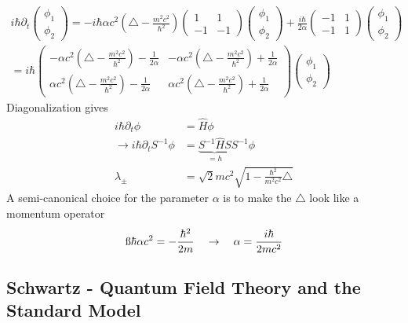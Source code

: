 \documentclass[10pt,a4paper]{book}
\theoremstyle{definition}
\begin{document}
\begin{align}
i\hbar\partial_t\begin{pmatrix}
\phi_1 \\
\phi_2 
\end{pmatrix}=-i\hbar\alpha c^2\left(\triangle-\frac{m^2c^2}{\hbar^2}\right)
\begin{pmatrix}
 1 &  1 \\
-1 & -1 
\end{pmatrix}\begin{pmatrix}
\phi_1 \\
\phi_2 
\end{pmatrix}
+\frac{i\hbar}{2\alpha}
\begin{pmatrix}
-1 &  1 \\
-1 &  1 
\end{pmatrix}
\begin{pmatrix}
\phi_1 \\
\phi_2 
\end{pmatrix}\\
=i\hbar\begin{pmatrix}
-\alpha c^2\left(\triangle-\frac{m^2c^2}{\hbar^2}\right)-\frac{1}{2\alpha} &  -\alpha c^2\left(\triangle-\frac{m^2c^2}{\hbar^2}\right)+\frac{1}{2\alpha} \\
\alpha c^2\left(\triangle-\frac{m^2c^2}{\hbar^2}\right)-\frac{1}{2\alpha} &  \alpha c^2\left(\triangle-\frac{m^2c^2}{\hbar^2}\right)+\frac{1}{2\alpha}
\end{pmatrix}
\begin{pmatrix}
\phi_1  \\
\phi_2  
\end{pmatrix}
\end{align}
Diagonalization gives
\begin{align}
    i\hbar\partial_t\phi&=\hat{H}\phi\\
    \rightarrow i\hbar\partial_tS^{-1}\phi&=\underbrace{S^{-1}\hat{H}S}_{=h}S^{-1}\phi\\
    \lambda_\pm&=\sqrt{2}mc^2\sqrt{1-\frac{\hbar^2}{m^2c^2}\triangle}
\end{align}
A semi-canonical choice for the parameter $\alpha$ is to make the $\triangle$ look like a momentum operator
\begin{align}
    \i\hbar\alpha c^2=-\frac{\hbar^2}{2m}\quad\rightarrow\quad\alpha=\frac{i\hbar}{2mc^2}
\end{align}

\subsection{{\sc Schwartz} - Quantum Field Theory and the Standard Model}
\end{document}
